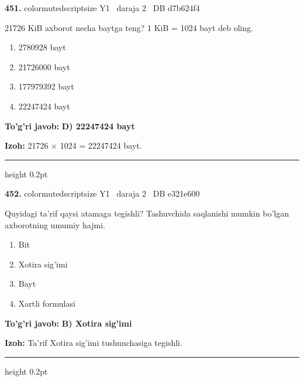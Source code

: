 \documentclass[10pt,a4paper,oneside]{article}
\begin{document}
\noindent\textbf{\color{ink}451.}  {color{muted}scriptsize Y1 \textbullet\ daraja 2 \textbullet\ DB d7b624f4}
\par
21726 KiB axborot necha baytga teng? 1 KiB = 1024 bayt deb oling.
\begin{enumerate}[label=\Alph*),leftmargin=9mm]
\item 2780928 bayt
\item 21726000 bayt
\item 177979392 bayt
\item 22247424 bayt
\end{enumerate}
\begin{tcolorbox}[enhanced,breakable,colback=teal!4,colframe=teal!50!black,boxrule=0.5pt,arc=1.1mm,left=3mm,right=3mm,top=1.7mm,bottom=1.7mm,before skip=2mm,after skip=2mm]
\textbf{\color{teal}To'g'ri javob:} \textbf{D) 22247424 bayt}
\par\smallskip
\textbf{Izoh:} 21726 \ensuremath{\times} 1024 = 22247424 bayt.
\end{tcolorbox}
\vspace{2mm}\hrule height 0.2pt \vspace{3mm}

\noindent\textbf{\color{ink}452.}  {color{muted}scriptsize Y1 \textbullet\ daraja 2 \textbullet\ DB e321e600}
\par
Quyidagi ta'rif qaysi atamaga tegishli? Tashuvchida saqlanishi mumkin bo'lgan axborotning umumiy hajmi.
\begin{enumerate}[label=\Alph*),leftmargin=9mm]
\item Bit
\item Xotira sig'imi
\item Bayt
\item Xartli formulasi
\end{enumerate}
\begin{tcolorbox}[enhanced,breakable,colback=teal!4,colframe=teal!50!black,boxrule=0.5pt,arc=1.1mm,left=3mm,right=3mm,top=1.7mm,bottom=1.7mm,before skip=2mm,after skip=2mm]
\textbf{\color{teal}To'g'ri javob:} \textbf{B) Xotira sig'imi}
\par\smallskip
\textbf{Izoh:} Ta'rif Xotira sig'imi tushunchasiga tegishli.
\end{tcolorbox}
\vspace{2mm}\hrule height 0.2pt \vspace{3mm}
\end{document}
